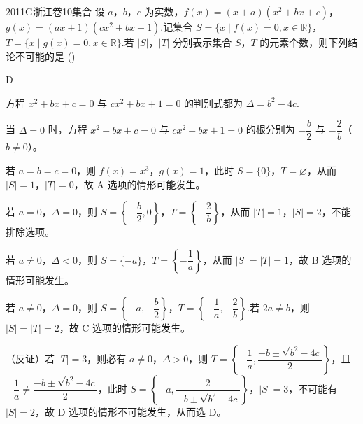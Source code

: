 
\begin{problem}{2011}{G}{浙江卷}{10}{集合}
设 $ a $，$ b $，$ c $ 为实数，$ f(x)=(x+a)(x^2+bx+c) $，$ g(x)=(ax+1)(cx^2+bx+1) $.记集合 $ S=\{x\mid f(x)=0,x\in\mathbb{R}\} $，$ T=\{x\mid g(x)=0,x\in\mathbb{R}\} $.若 $ |S| $，$ |T| $ 分别表示集合 $ S $，$ T $ 的元素个数，则下列结论不可能的是 (\hspace{1cm})
\begin{choices}
\end{choices}
\end{problem}

\begin{answer}
D
\end{answer}

\begin{solutions}
 方程 $ x^2+bx+c=0 $ 与 $ cx^2+bx+1=0 $ 的判别式都为 $ \Delta=b^2-4c $.

当 $ \Delta=0 $ 时，方程 $ x^2+bx+c=0 $ 与 $ cx^2+bx+1=0 $ 的根分别为 $ -\dfrac{b}{2} $ 与 $ -\dfrac{2}{b} $（$ b\neq0 $）。

 若 $ a=b=c=0 $，则 $ f(x)=x^3 $，$ g(x)=1 $，此时 $ S=\{0\} $，$ T=\varnothing $，从而 $ |S|=1 $，$ |T|=0 $，故 A 选项的情形可能发生。

 若 $ a=0 $，$ \Delta=0 $，则 $ S=\left\{-\dfrac{b}{2},0\right\} $，$ T=\left\{-\dfrac{2}{b}\right\} $，从而 $ |T|=1 $，$ |S|=2 $，不能排除选项。

 若 $ a\neq0 $，$ \Delta<0 $，则 $ S=\{-a\} $，$ T=\left\{-\dfrac{1}{a}\right\} $，从而 $ |S|=|T|=1 $，故 B 选项的情形可能发生。

 若 $ a\neq0 $，$ \Delta=0 $，则 $ S=\left\{-a,-\dfrac{b}{2}\right\} $，$ T=\left\{-\dfrac{1}{a},-\dfrac{2}{b}\right\} $.若 $ 2a\neq b $，则 $ |S|=|T|=2 $，故 C 选项的情形可能发生。

 （反证）若 $ |T|=3 $，则必有 $ a\neq0 $，$ \Delta>0 $，则 $ T=\left\{-\dfrac{1}{a},\dfrac{-b\pm\sqrt{b^2-4c}}{2}\right\} $，且 $ -\dfrac{1}{a}\neq\dfrac{-b\pm\sqrt{b^2-4c}}{2} $，此时 $ S=\left\{-a,\dfrac{2}{-b\pm\sqrt{b^2-4c}}\right\} $，$ |S|=3 $，不可能有 $ |S|=2 $，故 D 选项的情形不可能发生，从而选 D。
\end{solutions}